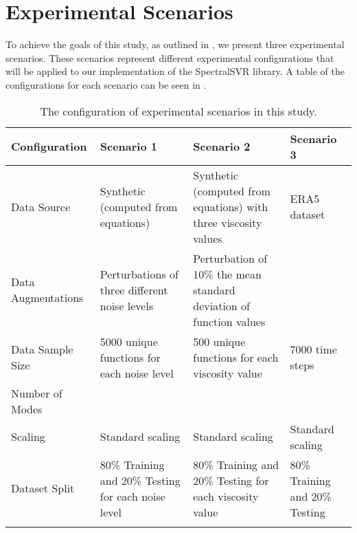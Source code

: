 \section{Experimental Scenarios}\label{sec:experimental_scenarios}
\noindent To achieve the goals of this study, as outlined in , we present three experimental scenarios. These scenarios represent different experimental configurations that will be applied to our implementation of the SpectralSVR library. A table of the configurations for each scenario can be seen in .

\begin{table}[H]
  \caption{The configuration of experimental scenarios in this study.}\label{table:experimental_scenarios}
  \centering
  \begin{tabularx}{\textwidth}{L{0.75}*{3}{L{1.09}}} %
    \toprule
    Configuration                    & Scenario 1                                          & Scenario 2                                                          & Scenario 3                                 \\
    \midrule
    Data Source                      & Synthetic (computed from equations)                 & Synthetic (computed from equations) with three viscosity values     & ERA5 dataset                               \\\addlinespace[0.5em]
    Data Augmentations               & Perturbations of three different noise levels       & Perturbation of 10\% the mean standard deviation of function values &                                            \\\addlinespace[0.5em]
    Data Sample Size                 & 5000 unique functions for each noise level          & 500 unique functions for each viscosity value                       & 7000 time steps                            \\\addlinespace[0.5em]
    Number of Modes                  &                                                     &                                                                     &                                            \\\addlinespace[0.5em]
    Scaling                          & Standard scaling                                    & Standard scaling                                                    & Standard scaling                           \\\addlinespace[0.5em]
    Dataset Split                    & 80\% Training and 20\% Testing for each noise level & 80\% Training and 20\% Testing for each viscosity value             & 80\% Training and 20\% Testing             \\\addlinespace[0.5em]

\end{tabularx}
\end{table}
